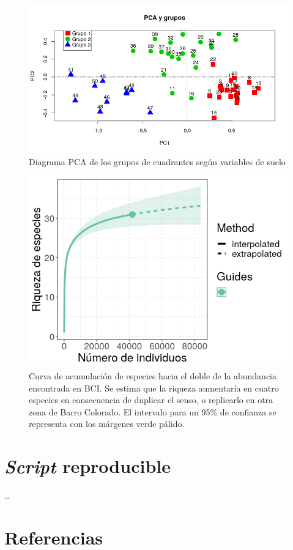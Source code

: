 \documentclass[11pt,]{article}
\begin{document}
\begin{figure}
\centering
\includegraphics{grafico_pca_suelo.png}
\caption{Diagrama PCA de los grupos de cuadrantes según variables de
suelo \label{fig:grafico_pca_suelo}}
\end{figure}

\begin{figure}
\centering
\includegraphics[height=0.45000\textwidth]{curva_extrapol_doble_esfuerzo.png}
\caption{Curva de acumulación de especies hacia el doble de la
abundancia encontrada en BCI. Se estima que la riqueza aumentaría en
cuatro especies en consecuencia de duplicar el senso, o replicarlo en
otra zona de Barro Colorado. El intervalo para un 95\% de confianza se
representa con los márgenes verde pálido.
\label{fig:curva_extrapol_doble_esfuerzo}}
\end{figure}

\section{\texorpdfstring{\emph{Script}
reproducible}{Script reproducible}}\label{script-reproducible}

\ldots

\section*{Referencias}\label{referencias}
\end{document}
